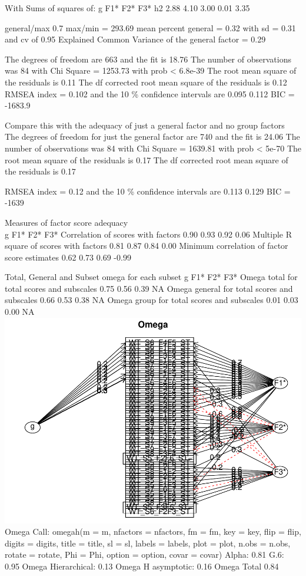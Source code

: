 \documentclass[
]{article}
\begin{document}
With Sums of squares of: g F1* F2* F3* h2 2.88 4.10 3.00 0.01 3.35

general/max 0.7 max/min = 293.69 mean percent general = 0.32 with sd =
0.31 and cv of 0.95 Explained Common Variance of the general factor =
0.29

The degrees of freedom are 663 and the fit is 18.76 The number of
observations was 84 with Chi Square = 1253.73 with prob \textless{}
6.8e-39 The root mean square of the residuals is 0.11 The df corrected
root mean square of the residuals is 0.12 RMSEA index = 0.102 and the 10
\% confidence intervals are 0.095 0.112 BIC = -1683.9

Compare this with the adequacy of just a general factor and no group
factors The degrees of freedom for just the general factor are 740 and
the fit is 24.06 The number of observations was 84 with Chi Square =
1639.81 with prob \textless{} 5e-70 The root mean square of the
residuals is 0.17 The df corrected root mean square of the residuals is
0.17

RMSEA index = 0.12 and the 10 \% confidence intervals are 0.113 0.129
BIC = -1639

Measures of factor score adequacy\\
g F1* F2* F3* Correlation of scores with factors 0.90 0.93 0.92 0.06
Multiple R square of scores with factors 0.81 0.87 0.84 0.00 Minimum
correlation of factor score estimates 0.62 0.73 0.69 -0.99

Total, General and Subset omega for each subset g F1* F2* F3* Omega
total for total scores and subscales 0.75 0.56 0.39 NA Omega general for
total scores and subscales 0.66 0.53 0.38 NA Omega group for total
scores and subscales 0.01 0.03 0.00 NA
\includegraphics{expertise_2024_09_26_no_outlierdetection_MK_files/figure-latex/sjt_omega-2.pdf}
Omega Call: omegah(m = m, nfactors = nfactors, fm = fm, key = key, flip
= flip, digits = digits, title = title, sl = sl, labels = labels, plot =
plot, n.obs = n.obs, rotate = rotate, Phi = Phi, option = option, covar
= covar) Alpha: 0.81 G.6: 0.95 Omega Hierarchical: 0.13 Omega H
asymptotic: 0.16 Omega Total 0.84
\end{document}
